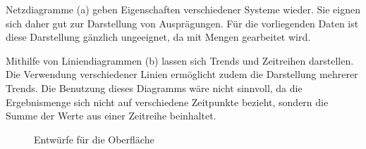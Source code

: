 Netzdiagramme (a) geben Eigenschaften verschiedener Systeme wieder. Sie eignen sich daher gut zur Darstellung von Ausprägungen. Für die vorliegenden Daten ist diese Darstellung gänzlich ungeeignet, da mit Mengen gearbeitet wird. 

Mithilfe von Liniendiagrammen (b) lassen sich Trends und Zeitreihen darstellen. Die Verwendung verschiedener Linien ermöglicht zudem die Darstellung mehrerer Trends. Die Benutzung dieses Diagramms wäre nicht sinnvoll, da die Ergebnismenge sich nicht auf verschiedene Zeitpunkte bezieht, sondern die Summe der Werte aus einer Zeitreihe beinhaltet. 

\begin{figure}[htbp]
\hfill
{}\hfill
{}\hfill
{}
\caption{Entwürfe für die Oberfläche}
\label{konzept_darstellung2}
\end{figure}

